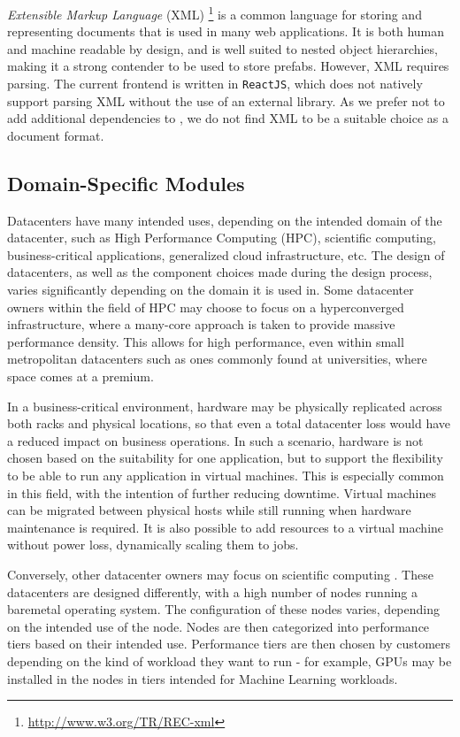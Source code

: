 \documentclass[11pt]{article}
\begin{document}
		\textit{Extensible Markup Language} (XML) \footnote{\url{http://www.w3.org/TR/REC-xml}} is a common language for storing and representing documents that is used in many web applications.
		It is both human and machine readable by design, and is well suited to nested object hierarchies, making it a strong contender to be used to store prefabs.
		However, XML requires parsing.
		The current \opendc{} frontend is written in \verb|ReactJS|, which does not natively support parsing XML without the use of an external library.
		As we prefer not to add additional dependencies to \opendc{}, we do not find XML to be a suitable choice as a document format.
	
	\subsection{Domain-Specific Modules}
		Datacenters have many intended uses, depending on the intended domain of the datacenter, such as High Performance Computing (HPC), scientific computing, business-critical applications, generalized cloud infrastructure, etc.
		The design of datacenters, as well as the component choices made during the design process, varies significantly depending on the domain it is used in.
		Some datacenter owners within the field of HPC may choose to focus on a hyperconverged infrastructure, where a many-core approach is taken to provide massive performance density.
		This allows for high performance, even within small metropolitan datacenters such as ones commonly found at universities, where space comes at a premium.

		In a business-critical environment, hardware may be physically replicated across both racks and physical locations, so that even a total datacenter loss would have a reduced impact on business operations.
		In such a scenario, hardware is not chosen based on the suitability for one application, but to support the flexibility to be able to run any application in virtual machines.
		This is especially common in this field, with the intention of further reducing downtime.
		Virtual machines can be migrated between physical hosts while still running when hardware maintenance is required.
		It is also possible to add resources to a virtual machine without power loss, dynamically scaling them to jobs.

		Conversely, other datacenter owners may focus on scientific computing \cite{SURF2020}.
		These datacenters are designed differently, with a high number of nodes running a baremetal operating system.
		The configuration of these nodes varies, depending on the intended use of the node.
		Nodes are then categorized into performance tiers based on their intended use.
		Performance tiers are then chosen by customers depending on the kind of workload they want to run - for example, GPUs may be installed in the nodes in tiers intended for Machine Learning workloads.
\end{document}
